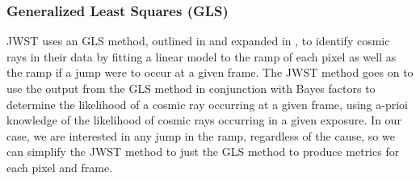 \subsubsection{Generalized Least Squares (GLS)}
JWST uses an GLS method, outlined in \cite{robberto2014generalized} and expanded in \cite{robberto2015cr}, to identify cosmic rays in their data by fitting a linear model to the ramp of each pixel as well as the ramp if a jump were to occur at a given frame.
The JWST method goes on to use the output from the GLS method in conjunction with Bayes factors to determine the likelihood of a cosmic ray occurring at a given frame, using a-prioi knowledge of the likelihood of cosmic rays occurring in a given exposure.
In our case, we are interested in any jump in the ramp, regardless of the cause, so we can simplify the JWST method to just the GLS method to produce metrics for each pixel and frame.


